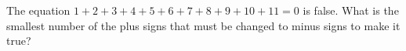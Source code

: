 The equation $1+2+3+4+5+6+7+8+9+10+11=0$ is false. What is the smallest number of the plus signs that must be changed to minus signs to make it true?

